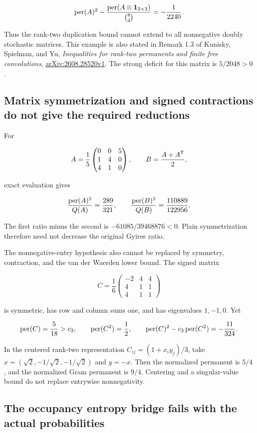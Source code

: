 \[
\operatorname{per}(A)^2-
\frac{\operatorname{per}(A\otimes\mathbf1_{2\times2})}{\binom84}
=-\frac1{2240}.
\]

Thus the rank-two duplication bound cannot extend to all nonnegative doubly stochastic matrices. This example is also stated in Remark 1.3 of Kunisky, Spielman, and Yu, \emph{Inequalities for rank-two permanents and finite free convolutions}, \href{https://arxiv.org/html/2608.28520v1}{arXiv:2608.28520v1}. The strong deficit for this matrix is \(5/2048>0\).

\subsection{Matrix symmetrization and signed contractions do not give the required reductions}\label{app:additional-12}

For

\[
A=\frac15\begin{pmatrix}0&0&5\\1&4&0\\4&1&0\end{pmatrix},\qquad
B=\frac{A+A^{\mathsf{T}}}{2},
\]

exact evaluation gives

\[
\frac{\operatorname{per}(A)^2}{Q(A)}=\frac{289}{321},\qquad
\frac{\operatorname{per}(B)^2}{Q(B)}=\frac{110889}{122956}.
\]

The first ratio minus the second is \(-61085/39468876<0\). Plain symmetrization therefore need not decrease the original Gyires ratio.

The nonnegative-entry hypothesis also cannot be replaced by symmetry, contraction, and the van der Waerden lower bound. The signed matrix

\[
C=\frac16\begin{pmatrix}-2&4&4\\4&1&1\\4&1&1\end{pmatrix}
\]

is symmetric, has row and column sums one, and has eigenvalues \(1,-1,0\). Yet

\[
\operatorname{per}(C)=\frac5{18}>c_3,\qquad
\operatorname{per}(C^2)=\frac12,\qquad
\operatorname{per}(C)^2-c_3\operatorname{per}(C^2)=-\frac{11}{324}.
\]

In the centered rank-two representation \(C_{ij}=(1+x_iy_j)/3\), take \(x=(\sqrt2,-1/\sqrt2,-1/\sqrt2)\) and \(y=-x\). Then the normalized permanent is \(5/4\), and the normalized Gram permanent is \(9/4\). Centering and a singular-value bound do not replace entrywise nonnegativity.

\subsection{The occupancy entropy bridge fails with the actual probabilities}\label{app:additional-13}

